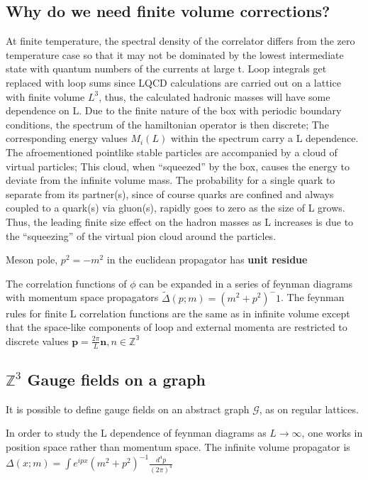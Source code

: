 \documentclass[12pt,tightenlines, raggedbottom, prd, notitlepage]{revtex4-1}
\begin{document}
\subsection*{Why do we need finite volume corrections?}
At finite temperature, the spectral density of the correlator differs from the zero temperature case
so that it may not be dominated by the lowest intermediate state with quantum numbers of the currents 
at large t. Loop integrals get replaced with loop sums since LQCD calculations are carried out on a lattice
with finite volume $L^3$, thus, the calculated hadronic masses will have some dependence on L.
Due to the finite nature of the box with periodic boundary conditions, the spectrum of the
hamiltonian operator is then discrete; The corresponding energy values $M_i(L)$ within the spectrum
carry a L dependence. The afroementioned pointlike stable particles are accompanied by a cloud of 
virtual particles; This cloud, when ``squeezed'' by the box, causes the energy to deviate from the
infinite volume mass. The probability for a single quark to separate from its partner(s), since of course
quarks are confined and always coupled to a quark(s) via gluon(s), rapidly goes to zero as the size of L
grows. Thus, the leading finite size effect on the hadron masses as L increases is due to the ``squeezing''
of the virtual pion cloud around the particles. 

Meson pole, $p^2 = -m^2$ in the euclidean propagator has \textbf{unit residue} 

The correlation functions of $\phi$ can be expanded in a series of feynman diagrams with momentum
space propagators $\tilde{\Delta}(p;m) = (m^2 + p^2)^-1$. The feynman rules for finite L correlation functions
are the same as in infinite volume except that the space-like components of loop and external momenta
are restricted to discrete values $\textbf{p} = \frac{2\pi}{L}\textbf{n}, n\in \mathbb{Z^3}$

\subsection*{$\mathbb{Z}^3$ Gauge fields on a graph}

It is possible to define gauge fields on an abstract graph $\mathcal{G}$, as on regular lattices. 

In order to study the L dependence of feynman diagrams as $L\rightarrow \infty$, one works in position
space rather than momentum space. The infinite volume propagator is 
$\Delta(x;m) = \int e^{ipx}(m^2 + p^2)^{-1}\frac{d^4p}{(2\pi)^4}$
\end{document}
